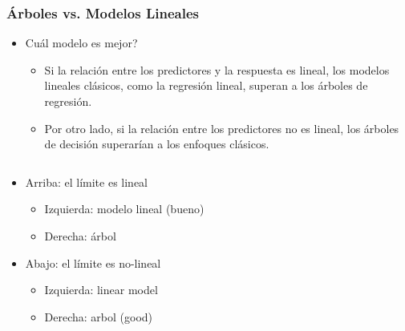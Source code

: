 \documentclass[
  shownotes,
  xcolor={svgnames},
  hyperref={colorlinks,citecolor=DarkBlue,linkcolor=DarkRed,urlcolor=DarkBlue}
  , aspectratio=169]{beamer}
\begin{document}
\begin{frame}[fragile]
\frametitle{Árboles vs. Modelos Lineales}
\begin{itemize}
\item Cuál modelo es mejor?

\begin{itemize}
  \item Si la relación entre los predictores y la respuesta es lineal, los modelos lineales clásicos, como la regresión lineal, superan a los árboles de regresión. 
  \item Por otro lado, si la relación entre los predictores no es lineal, los árboles de decisión superarían a los enfoques clásicos.
\end{itemize}
\end{itemize}


\begin{columns}[T] %
\begin{column}{.42\textwidth}
\scriptsize
\begin{itemize}  
\item Arriba: el límite es lineal
  \begin{itemize}
    \scriptsize
    \item Izquierda:  modelo lineal (bueno)
    \item Derecha: árbol 
  \end{itemize}

\item Abajo: el límite es no-lineal
  \begin{itemize}
    \scriptsize
    \item Izquierda: linear model 
    \item Derecha: arbol (good)
  \end{itemize}

\end{itemize}


\end{column}  
\hfill
\begin{column}{.48\textwidth}


\end{column}
\end{columns}
\end{frame}
\end{document}
